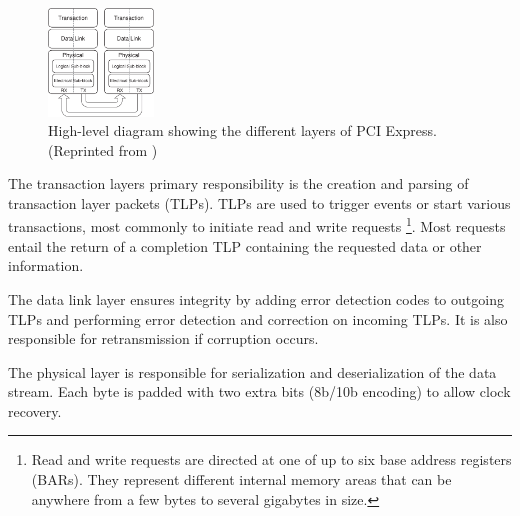 \begin{figure}[!ht]
    \centering
    \includegraphics[width=0.25\textwidth]{figures/pcie}
    \caption{High-level diagram showing the different layers of PCI Express. (Reprinted from \cite{pcie})}
    \label{fig:pcie}
\end{figure}

The transaction layers primary responsibility is the creation and parsing of transaction layer packets (TLPs).
TLPs are used to trigger events or start various transactions, most commonly to initiate read and write requests \footnote{
        Read and write requests are directed at one of up to six base address registers (BARs).
        They represent different internal memory areas that can be anywhere from a few bytes to several gigabytes in size.
    }.
Most requests entail the return of a completion TLP containing the requested data or other information.

The data link layer ensures integrity by adding error detection codes to outgoing TLPs and performing error detection and correction on incoming TLPs.
It is also responsible for retransmission if corruption occurs.

The physical layer is responsible for serialization and deserialization of the data stream.
Each byte is padded with two extra bits (8b/10b encoding) to allow clock recovery.


